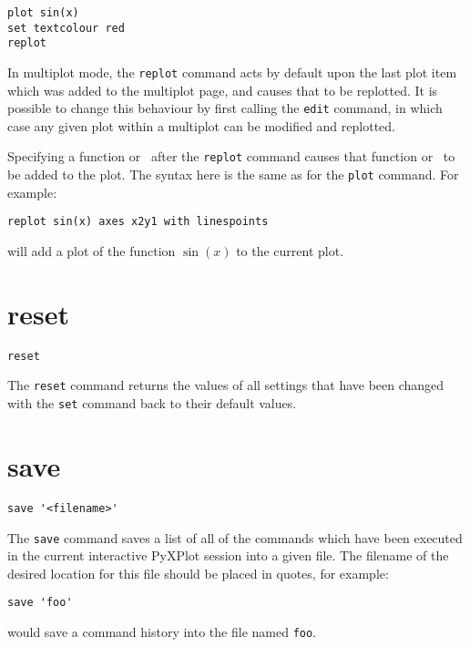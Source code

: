 \begin{verbatim}
plot sin(x)
set textcolour red
replot
\end{verbatim}

In multiplot mode, the {\tt replot} command acts by default upon the last plot
item which was added to the multiplot page, and causes that to be replotted. It
is possible to change this behaviour by first calling the {\tt edit} command, in
which case any given plot within a multiplot can be modified and replotted.

Specifying a function or \datafile\ after the {\tt replot} command causes that
function or \datafile\ to be added to the plot. The syntax here is the same as
for the {\tt plot} command.  For example:

\begin{verbatim}
replot sin(x) axes x2y1 with linespoints
\end{verbatim}

\noindent will add a plot of the function $\sin(x)$ to the current plot.

\section{reset}

\begin{verbatim}
reset
\end{verbatim}

The {\tt reset} command returns the values of all settings that have been
changed with the {\tt set} command back to their default values.


\section{save}

\begin{verbatim}
save '<filename>'
\end{verbatim}

The {\tt save} command saves a list of all of the commands which have been
executed in the current interactive PyXPlot session into a given file. The
filename of the desired location for this file should be placed in quotes, for
example:

\begin{verbatim}
save 'foo'
\end{verbatim}

\noindent would save a command history into the file named {\tt foo}.


